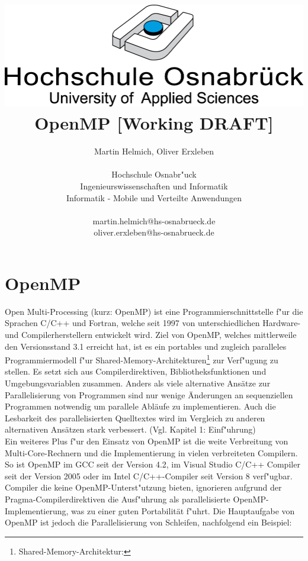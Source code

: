 \documentclass[a4paper,11pt]{scrartcl}
\begin{document}
\author{ Martin Helmich, Oliver Erxleben \\ \\ Hochschule Osnabr"uck \\
Ingenieurswissenschaften und Informatik \\ Informatik - Mobile und Verteilte Anwendungen
\\ \\ martin.helmich@hs-osnabrueck.de \\ oliver.erxleben@hs-osnabrueck.de }

\title{\includegraphics[scale=0.75,keepaspectratio]{img/hs_os.png}\linebreak \linebreak
OpenMP [Working DRAFT]}

\maketitle

\tableofcontents

\pagebreak

\section{OpenMP} Open Multi-Processing (kurz: OpenMP) ist eine Programmierschnittstelle
f"ur die Sprachen C/C++ und Fortran, welche seit 1997 von unterschiedlichen Hardware- und
Compilerherstellern entwickelt wird. Ziel von OpenMP, welches mittlerweile den
Versionsstand 3.1 erreicht hat, ist es ein portables und zugleich paralleles
Programmiermodell f"ur Shared-Memory-Architekturen\footnote{Shared-Memory-Architektur: }
zur Verf"ugung zu stellen. Es setzt sich aus Compilerdirektiven, Bibliotheksfunktionen und
Umgebungsvariablen zusammen. Anders als viele alternative Ansätze zur Parallelisierung von
Programmen sind nur wenige Änderungen an sequenziellen Programmen notwendig um parallele
Abläufe zu implementieren. Auch die Lesbarkeit des parallelisierten Quelltextes wird im
Vergleich zu anderen alternativen Ansätzen stark verbessert. (Vgl. \cite{omp08} Kapitel 1:
Einf"uhrung) \\ Ein weiteres Plus f"ur den Einsatz von OpenMP ist die weite Verbreitung
von Multi-Core-Rechnern und die Implementierung in vielen verbreiteten Compilern. So ist
OpenMP im GCC seit der Version 4.2, im Visual Studio C/C++ Compiler seit der Version 2005
oder im Intel C/C++-Compiler seit Version 8 verf"ugbar. Compiler die keine
OpenMP-Unterst"utzung bieten, ignorieren aufgrund der Pragma-Compilerdirektiven die
Ausf"uhrung als parallelisierte OpenMP-Implementierung, was zu einer guten Portabilität
f"uhrt. Die Hauptaufgabe von OpenMP ist jedoch die Parallelisierung von Schleifen,
nachfolgend ein Beispiel: \\
\end{document}
